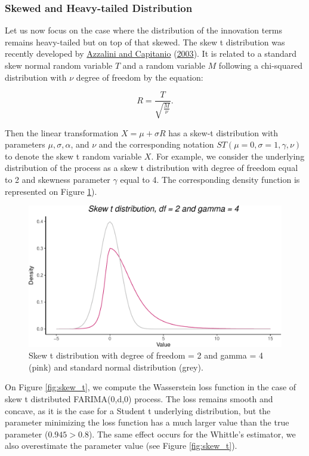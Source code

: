 \documentclass[
  11pt,
]{article}
\begin{document}
\hypertarget{skewed-and-heavy-tailed-distribution}{%
\subsubsection{Skewed and Heavy-tailed
Distribution}\label{skewed-and-heavy-tailed-distribution}}

Let us now focus on the case where the distribution of the innovation
terms remains heavy-tailed but on top of that skewed. The skew t
distribution was recently developed by
\protect\hyperlink{ref-azzalini2003distributions}{Azzalini and
Capitanio} (\protect\hyperlink{ref-azzalini2003distributions}{2003}). It
is related to a standard skew normal random variable \(T\) and a random
variable \(M\) following a chi-squared distribution with \(\nu\) degree
of freedom by the equation:

\[R=\frac{T}{\sqrt{\frac{M}{\nu}}}.\]

Then the linear transformation \(X=\mu+\sigma R\) has a skew-t
distribution with parameters \(\mu, \sigma, \alpha\), and \(\nu\) and
the corresponding notation \(S T(\mu = 0, \sigma = 1, \gamma, \nu)\) to
denote the skew t random variable \(X\). For example, we consider the
underlying distribution of the process as a skew t distribution with
degree of freedom equal to 2 and skewness parameter \(\gamma\) equal to
4. The corresponding density function is represented on Figure
\ref{fig:skewt_density}).

\begin{figure}

{\centering \includegraphics[width=0.5\linewidth]{Master_thesis_V2_files/figure-latex/skewt_density-1} 

}

\caption{Skew t distribution with degree of freedom = 2 and gamma = 4 (pink) and standard normal distribution (grey).}\label{fig:skewt_density}
\end{figure}

On Figure \ref{fig:skew_t}, we compute the Wasserstein loss function in
the case of skew t distributed FARIMA(0,d,0) process. The loss remains
smooth and concave, as it is the case for a Student t underlying
distribution, but the parameter minimizing the loss function has a much
larger value than the true parameter (\(0.945 > 0.8\)). The same effect
occurs for the Whittle's estimator, we also overestimate the parameter
value (see Figure \ref{fig:skew_t}).
\end{document}
